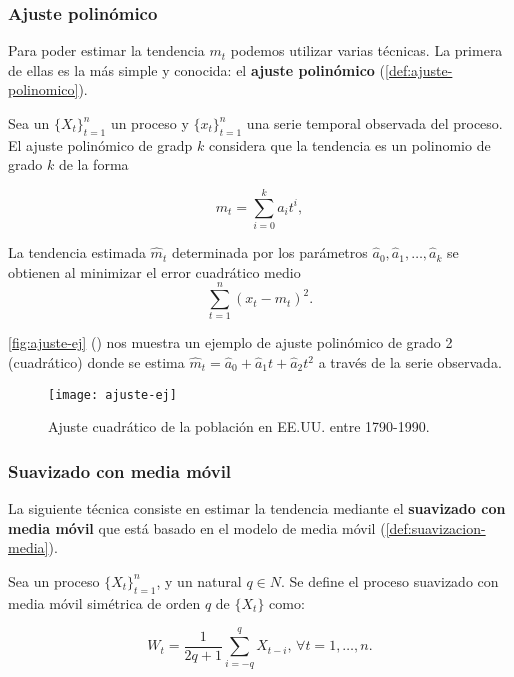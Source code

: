 \subsubsection{Ajuste polinómico}

Para poder estimar la tendencia $m_t$ podemos utilizar varias técnicas. La primera de ellas es la más simple y conocida: el \textbf{ajuste polinómico} (\autoref{def:ajuste-polinomico}).

\begin{definicion}
  Sea un $\{X_t\}_{t = 1}^n$ un proceso y $\{x_t\}_{t = 1}^n$ una serie temporal observada del proceso. El ajuste polinómico de gradp $k$ considera que la tendencia es un polinomio de grado $k$ de la forma

  $$m_t = \sum \limits^k_{i = 0} a_i t^i,$$

  La tendencia estimada $\hat{m}_t$ determinada por los parámetros $\hat{a}_0, \hat{a}_1, \ldots, \hat{a}_k$ se obtienen al minimizar el error cuadrático medio $$\sum \limits^n_{t = 1} (x_t - m_t)^2.$$
  \label{def:ajuste-polinomico}
\end{definicion}

\autoref{fig:ajuste-ej} (\cite{brockwell2002introduction}) nos muestra un ejemplo de ajuste polinómico de grado 2 (cuadrático) donde se estima $\hat{m}_t = \hat{a}_0 + \hat{a}_1 t + \hat{a}_2 t^2$ a través de la serie observada.

\begin{figure}[htpb]
  \centering
  \texttt{[image: ajuste-ej]}
  \caption{Ajuste cuadrático de la población en EE.UU. entre 1790-1990.}
  \label{fig:ajuste-ej}
\end{figure}

\subsubsection{Suavizado con media móvil}

La siguiente técnica consiste en estimar la tendencia mediante el \textbf{suavizado con media móvil} que está basado en el modelo de media móvil (\autoref{def:suavizacion-media}).

\begin{definicion}
  Sea un proceso $\{X_t\}_{t = 1}^n$, y un natural $q \in N$. Se define el proceso suavizado con media móvil simétrica de orden $q$ de $\{X_t\}$ como:

  $$ W_t = \dfrac{1}{2q + 1} \sum \limits^q_{i = -q} X_{t - i}, \, \forall t = 1, \ldots, n.$$
  \label{def:suavizacion-media}
\end{definicion}

